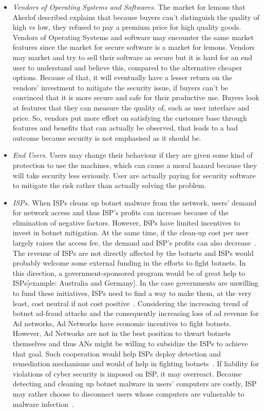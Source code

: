 \begin{itemize}
\item \textit{Vendors of Operating Systems and Softwares.} The market for lemons that Akerlof described explains that because buyers can’t distinguish the quality of high vs low, they refused to pay a premium price for high quality goods. Vendors of Operating Systems and software may encounter the same market features since the market for secure software is a market for lemons. Vendors may market and try to sell their software as secure but it is hard for an end user to understand and believe this, compared to the alternative cheaper options. Because of that, it will eventually have a lesser return on the vendors’ investment to mitigate the security issue, if buyers can’t be convinced that it is more secure and safe for their productive use. Buyers look at features that they can measure the quality of, such as user interface and price. So, vendors put more effort on satisfying the customer base through features and benefits that can actually be observed, that leads to a bad outcome because security is not emphasised as it should be.

\item \textit{End Users.} Users may change their behaviour if they are given some kind of protection to use the machines, which can cause a moral hazard because they will take security less seriously. User are actually paying for security software to mitigate the risk rather than actually solving the problem.


\item \textit{ISPs.} When ISPs cleans up botnet malware from the network, users’ demand for network access and thus ISP’s profits can increase because of the elimination of negative factors. However, ISPs have limited incentives to invest in botnet mitigation. At the same time, if the clean-up cost per user largely raises the access fee, the demand and ISP’s profits can also decrease~\cite{asghari2010botnet}. The revenue of ISPs are not directly affected by the botnets and ISPs would probably welcome some external funding in the efforts to fight botnets. In this direction, a government-sponsored program would be of great help to ISPs[example: Australia and Germany]. In the case governments are unwilling to fund these initiatives, ISPs need to find a way to make them, at the very least, cost neutral if not cost positive~\cite{asghari2010botnet}. Considering the increasing trend of botnet ad-fraud attacks and the consequently increasing loss of ad revenue for Ad networks, Ad Networks have economic incentives to fight botnets. However, Ad Networks are not in the best position to thwart botnets themselves and thus ANs might be willing to subsidize the ISPs to achieve that goal. Such cooperation would help ISPs deploy detection and remediation mechanisms and would of help in fighting botnets~\cite{vratonjic2010isps}. If liability for violations of cyber security is imposed on ISP, it may overreact. Because detecting and cleaning up botnet malware in users’ computers are costly, ISP may rather choose to disconnect users whose computers are vulnerable to malware infection~\cite{kinukawa2012should}.

\end{itemize}

